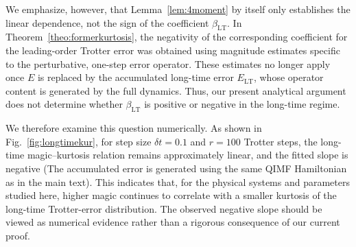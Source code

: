 \documentclass[showpacs,amsmath,amssymb,twocolumn,aps,pra,superscriptaddress,notitlepage,10pt]{revtex4-2}
\begin{document}
We emphasize, however, that Lemma~\ref{lem:4moment} by itself only establishes the linear dependence, not the sign of the coefficient \(\beta_{\mathrm{LT}}\). In Theorem~\ref{theo:formerkurtosis}, the negativity of the corresponding coefficient for the leading-order Trotter error was obtained using magnitude estimates specific to the perturbative, one-step error operator. These estimates no longer apply once \(E\) is replaced by the accumulated long-time error \(E_{\mathrm{LT}}\), whose operator content is generated by the full dynamics. Thus, our present analytical argument does not determine whether \(\beta_{\mathrm{LT}}\) is positive or negative in the long-time regime.

We therefore examine this question numerically. As shown in Fig.~\ref{fig:longtimekur}, for step size \(\delta t=0.1\) and \(r=100\) Trotter steps, the long-time magic--kurtosis relation remains approximately linear, and the fitted slope is negative (The accumulated error is generated using the same QIMF Hamiltonian as in the main text). This indicates that, for the physical systems and parameters studied here, higher magic continues to correlate with a smaller kurtosis of the long-time Trotter-error distribution. The observed negative slope should be viewed as numerical evidence rather than a rigorous consequence of our current proof.
\end{document}
